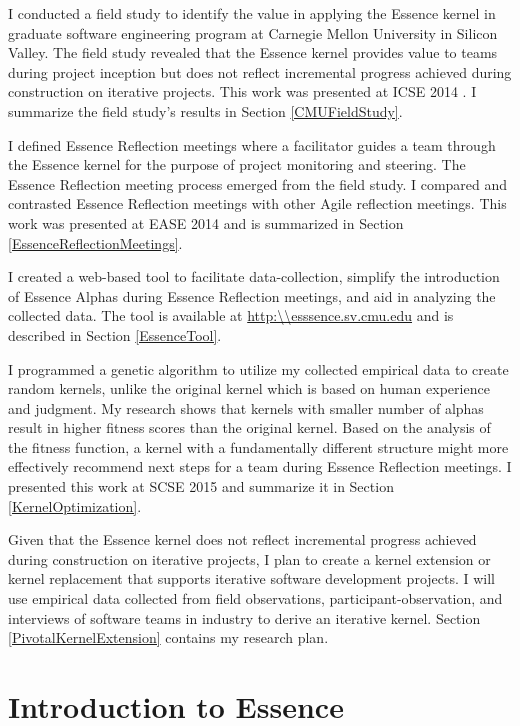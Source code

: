 \documentclass[preprint,12pt,3p]{elsarticle}
\begin{document}
I conducted a field study to identify the value in applying the Essence kernel in graduate software engineering program at Carnegie Mellon University in Silicon Valley. The field study revealed that the Essence kernel provides value to teams during project inception but does not reflect incremental progress achieved during construction on iterative projects. This work was presented at ICSE 2014 \cite{ICSE2014}. I summarize the field study's results in Section \ref{CMUFieldStudy}.

I defined Essence Reflection meetings where a facilitator guides a team through the Essence kernel for the purpose of project monitoring and steering. The Essence Reflection meeting process emerged from the field study. I compared and contrasted Essence Reflection meetings with other Agile reflection meetings. This work was presented at EASE 2014 \cite{EASE2014} and is summarized in Section \ref{EssenceReflectionMeetings}.

I created a web-based tool to facilitate data-collection, simplify the introduction of Essence Alphas during Essence Reflection meetings, and aid in analyzing the collected data. The tool is available at \url{http:\\esssence.sv.cmu.edu} and is described in Section \ref{EssenceTool}.

I programmed a genetic algorithm to utilize my collected empirical data to create random kernels, unlike the original kernel which is based on human experience and judgment. My research shows that kernels with smaller number of alphas result in higher fitness scores than the original kernel. Based on the analysis of the fitness function, a kernel with a fundamentally different structure might more effectively recommend next steps for a team during Essence Reflection meetings. I presented this work at SCSE 2015 and summarize it in Section \ref{KernelOptimization}.

Given that the Essence kernel does not reflect incremental progress achieved during construction on iterative projects, I plan to create a kernel extension or kernel replacement that supports iterative software development projects. I will use empirical data collected from field observations, participant-observation, and interviews of software teams in industry to derive an iterative kernel. Section \ref{PivotalKernelExtension} contains my research plan.

\section{Introduction to Essence}
\label{Method}
\end{document}
